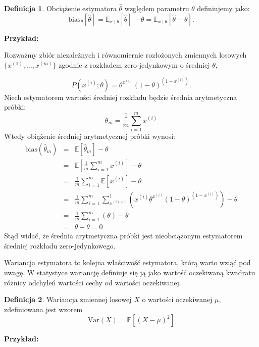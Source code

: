\documentclass[11pt]{book}
\theoremstyle{definition}
\newtheorem{definition}{Definicja}[section]
\begin{document}
\begin{definition}
Obciążenie estymatora $\hat{\theta}$ względem parametru $\theta$ definiujemy jako:
	\begin{equation}
	\text{bias}_{\theta}\left[\hat{\theta}\right] = \mathbb{E}_{x \mid \theta }\left[\hat{\theta}\right] - \theta = \mathbb{E}_{x\mid \theta} \left[\hat{\theta}-\theta\right].
	\end{equation}
	
\end{definition}
%
\noindent\textbf{Przykład:} 

\noindent Rozważmy zbiór niezależnych i równomiernie rozłożonych zmiennych losowych $\{{ x^{(1)}, \dots, x^{(m)} }\}$ zgodnie z rozkładem zero-jedynkowym o średniej $\theta$,

\begin{equation}
P(x^{(i)};\theta) = \theta^{x^{(i)}} \left( 1-\theta \right)^{(1-x^{(i)})}.
\end{equation}
%
Niech estymatorem wartości średniej rozkładu będzie średnia arytmetyczna próbki:
\begin{equation}
\theta_m = \frac{1}{m} \sum_{i=1}^m x^{(i)}
\end{equation}
Wtedy obiążenie średniej arytmetycznej próbki wynosi:
\begin{eqnarray}
\text{bias}\left(\hat{\theta}_m\right) &=& \mathbb{E} \left[\hat{\theta}_m \right] - \theta \nonumber \\
&=& \mathbb{E} \left[\frac{1}{m} \sum_{i=1}^m x^{(i)} \right] - \theta\nonumber \\
&=& \frac{1}{m} \sum_{i=1}^{m} \mathbb{E} \left[x^{(i)} \right] - \theta \nonumber \\
&=& \frac{1}{m} \sum_{i=1}^{m} \sum_{x^{(i)=0}}^{1} \left(x^{(i)}\theta^{x^{(i)}} (1-\theta)^{(1-x^{(i)})}\right) - \theta \nonumber \\
&=&  \frac{1}{m} \sum_{i=1}^{m} \left(\theta\right) - \theta \nonumber \\
&=& \theta - \theta = 0
\end{eqnarray}
%
Stąd widać, że średnia arytmetyczna próbki jest nieobciążonym estymatorem średniej rozkładu zero-jedynkowego.

Wariancja estymatora to kolejna właściwość estymatora, którą warto wziąć pod uwagę. W statystyce wariancję definiuje się ją jako wartość oczekiwaną kwadratu różnicy odchyleń wartości cechy od wartości oczekiwanej. 
%
\begin{definition}
Wariancja zmiennej losowej $X$ o wartości oczekiwanej $\mu$, zdefiniowana jest wzorem
\begin{equation}
\text{Var}(X) = \mathbb{E} \left[ \left(X - \mu \right)^2 \right]
\end{equation}
\end{definition}
\noindent\textbf{Przykład:} 
\end{document}
